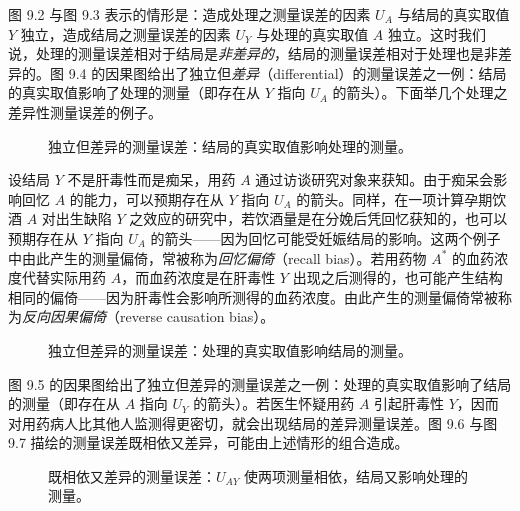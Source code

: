 图 9.2 与图 9.3 表示的情形是：造成处理之测量误差的因素 $U_A$ 与结局的真实取值 $Y$ 独立，造成结局之测量误差的因素 $U_Y$ 与处理的真实取值 $A$ 独立。这时我们说，处理的测量误差相对于结局是\emph{非差异的}，结局的测量误差相对于处理也是非差异的。图 9.4 的因果图给出了独立但\emph{差异}（differential）的测量误差之一例：结局的真实取值影响了处理的测量（即存在从 $Y$ 指向 $U_A$ 的箭头）。下面举几个处理之差异性测量误差的例子。

\begin{figure}[htbp]
\centering
{}
\caption{独立但差异的测量误差：结局的真实取值影响处理的测量。}
\label{fig:9.4}
\end{figure}

设结局 $Y$ 不是肝毒性而是痴呆，用药 $A$ 通过访谈研究对象来获知。由于痴呆会影响回忆 $A$ 的能力，可以预期存在从 $Y$ 指向 $U_A$ 的箭头。同样，在一项计算孕期饮酒 $A$ 对出生缺陷 $Y$ 之效应的研究中，若饮酒量是在分娩后凭回忆获知的，也可以预期存在从 $Y$ 指向 $U_A$ 的箭头——因为回忆可能受妊娠结局的影响。这两个例子中由此产生的测量偏倚，常被称为\emph{回忆偏倚}（recall bias）。若用药物 $A^{*}$ 的血药浓度代替实际用药 $A$，而血药浓度是在肝毒性 $Y$ 出现之后测得的，也可能产生结构相同的偏倚——因为肝毒性会影响所测得的血药浓度。由此产生的测量偏倚常被称为\emph{反向因果偏倚}（reverse causation bias）。

\begin{figure}[htbp]
\centering
{}
\caption{独立但差异的测量误差：处理的真实取值影响结局的测量。}
\label{fig:9.5}
\end{figure}

图 9.5 的因果图给出了独立但差异的测量误差之一例：处理的真实取值影响了结局的测量（即存在从 $A$ 指向 $U_Y$ 的箭头）。若医生怀疑用药 $A$ 引起肝毒性 $Y$，因而对用药病人比其他人监测得更密切，就会出现结局的差异测量误差。图 9.6 与图 9.7 描绘的测量误差既相依又差异，可能由上述情形的组合造成。

\begin{figure}[htbp]
\centering
{}
\caption{既相依又差异的测量误差：$U_{AY}$ 使两项测量相依，结局又影响处理的测量。}
\label{fig:9.6}
\end{figure}


